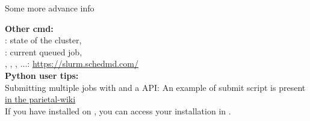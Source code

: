 \documentclass{beamer}
\begin{document}
    \begin{frame}[t]{Some more advance info}


        {\bf Other cmd:}\\[.5em]

            \myitem{} : state of the cluster,\\
            \myitem{} : current queued job,\\
            \myitem{} , , , ...: \url{https://slurm.schedmd.com/} \\[1em]

        {\bf Python user tips:}\\[.5em]

        \myitem{} Submitting multiple jobs with  and a  API: An example of submit script is present \href{https://gitlab.inria.fr/parietal/parietal-wiki/-/blob/master/tutorials/computers/margaret/scripts/submit_script.py}{in the parietal-wiki}
        \\[1em]


        \myitem{} If you have installed  on , you can access your installation in .

    \end{frame}
\end{document}

